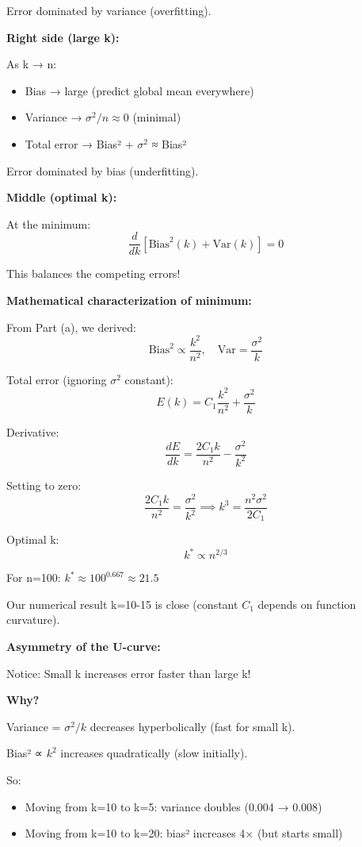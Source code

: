 \documentclass[12pt]{article}
\begin{document}
\begin{explanation}
Error dominated by variance (overfitting).

\textbf{Right side (large k):}

As k → n:
\begin{itemize}
    \item Bias → large (predict global mean everywhere)
    \item Variance → $\sigma^2/n \approx 0$ (minimal)
    \item Total error → Bias² + $\sigma^2$ ≈ Bias²
\end{itemize}

Error dominated by bias (underfitting).

\textbf{Middle (optimal k):}

At the minimum:
\[
\frac{d}{dk}[\text{Bias}^2(k) + \text{Var}(k)] = 0
\]

This balances the competing errors!

\textbf{Mathematical characterization of minimum:}

From Part (a), we derived:
\[
\text{Bias}^2 \propto \frac{k^2}{n^2}, \quad \text{Var} = \frac{\sigma^2}{k}
\]

Total error (ignoring $\sigma^2$ constant):
\[
E(k) = C_1\frac{k^2}{n^2} + \frac{\sigma^2}{k}
\]

Derivative:
\[
\frac{dE}{dk} = \frac{2C_1 k}{n^2} - \frac{\sigma^2}{k^2}
\]

Setting to zero:
\[
\frac{2C_1 k}{n^2} = \frac{\sigma^2}{k^2} \implies k^3 = \frac{n^2\sigma^2}{2C_1}
\]

Optimal k:
\[
k^* \propto n^{2/3}
\]

For n=100: $k^* \approx 100^{0.667} \approx 21.5$

Our numerical result k=10-15 is close (constant $C_1$ depends on function curvature).

\textbf{Asymmetry of the U-curve:}

Notice: Small k increases error faster than large k!

\textbf{Why?}

Variance = $\sigma^2/k$ decreases hyperbolically (fast for small k).

Bias² ∝ $k^2$ increases quadratically (slow initially).

So:
\begin{itemize}
    \item Moving from k=10 to k=5: variance doubles (0.004 → 0.008)
    \item Moving from k=10 to k=20: bias² increases 4× (but starts small)
\end{itemize}


\end{explanation}
\end{document}
